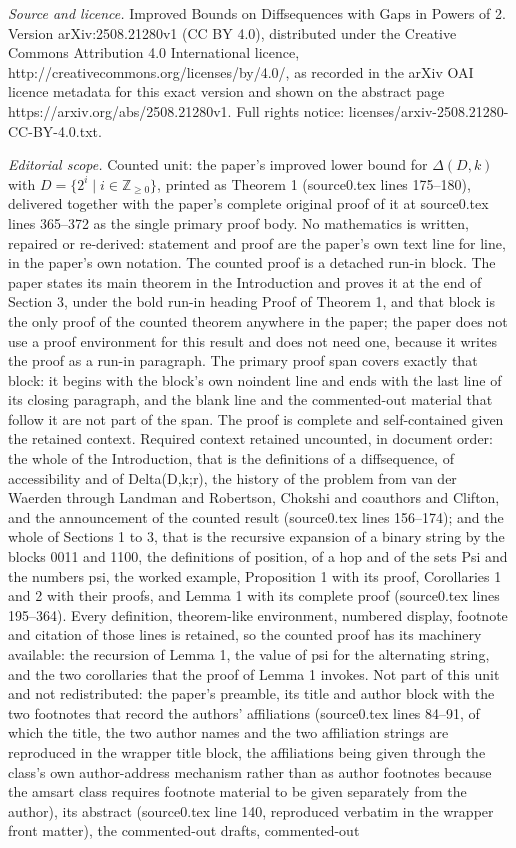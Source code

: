 \documentclass[10pt,a4paper]{amsart}
\begin{document}
\noindent\emph{Source and licence.} Improved Bounds on Diffsequences with Gaps in Powers of 2. Version arXiv:2508.21280v1 (CC BY 4.0), distributed under the Creative Commons Attribution 4.0 International licence, http://creativecommons.org/licenses/by/4.0/, as recorded in the arXiv OAI licence metadata for this exact version and shown on the abstract page https://arxiv.org/abs/2508.21280v1. Full rights notice: licenses/arxiv-2508.21280-CC-BY-4.0.txt.\par\smallskip
\noindent\textit{Editorial scope.} Counted unit: the paper's improved lower bound for $\Delta(D,k)$ with $D=\{2^i\mid i\in\mathbb{Z}_{\ge 0}\}$, printed as Theorem 1 (source0.tex lines 175--180), delivered together with the paper's complete original proof of it at source0.tex lines 365--372 as the single primary proof body. No mathematics is written, repaired or re-derived: statement and proof are the paper's own text line for line, in the paper's own notation. The counted proof is a detached run-in block. The paper states its main theorem in the Introduction and proves it at the end of Section 3, under the bold run-in heading Proof of Theorem 1, and that block is the only proof of the counted theorem anywhere in the paper; the paper does not use a proof environment for this result and does not need one, because it writes the proof as a run-in paragraph. The primary proof span covers exactly that block: it begins with the block's own noindent line and ends with the last line of its closing paragraph, and the blank line and the commented-out material that follow it are not part of the span. The proof is complete and self-contained given the retained context. Required context retained uncounted, in document order: the whole of the Introduction, that is the definitions of a diffsequence, of accessibility and of Delta(D,k;r), the history of the problem from van der Waerden through Landman and Robertson, Chokshi and coauthors and Clifton, and the announcement of the counted result (source0.tex lines 156--174); and the whole of Sections 1 to 3, that is the recursive expansion of a binary string by the blocks 0011 and 1100, the definitions of position, of a hop and of the sets Psi and the numbers psi, the worked example, Proposition 1 with its proof, Corollaries 1 and 2 with their proofs, and Lemma 1 with its complete proof (source0.tex lines 195--364). Every definition, theorem-like environment, numbered display, footnote and citation of those lines is retained, so the counted proof has its machinery available: the recursion of Lemma 1, the value of psi for the alternating string, and the two corollaries that the proof of Lemma 1 invokes. Not part of this unit and not redistributed: the paper's preamble, its title and author block with the two footnotes that record the authors' affiliations (source0.tex lines 84--91, of which the title, the two author names and the two affiliation strings are reproduced in the wrapper title block, the affiliations being given through the class's own author-address mechanism rather than as author footnotes because the amsart class requires footnote material to be given separately from the author), its abstract (source0.tex line 140, reproduced verbatim in the wrapper front matter), the commented-out drafts, commented-out 
\end{document}
